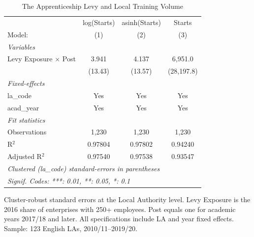 
\begin{table}[htbp]
   \caption{\label{tab:main} The Apprenticeship Levy and Local Training Volume}
   \centering
   \begin{tabular}{lccc}
      \tabularnewline \midrule \midrule
                                   & log(Starts) & asinh(Starts) & Starts \\   
      Model:                       & (1)         & (2)           & (3)\\  
      \midrule
      \emph{Variables}\\
      Levy Exposure $\times$ Post  & 3.941       & 4.137         & 6,951.0\\   
                                   & (13.43)     & (13.57)       & (28,197.8)\\   
      \midrule
      \emph{Fixed-effects}\\
      la\_code                     & Yes         & Yes           & Yes\\  
      acad\_year                   & Yes         & Yes           & Yes\\  
      \midrule
      \emph{Fit statistics}\\
      Observations                 & 1,230       & 1,230         & 1,230\\  
      R$^2$                        & 0.97804     & 0.97802       & 0.94240\\  
      Adjusted R$^2$               & 0.97540     & 0.97538       & 0.93547\\  
      \midrule \midrule
      \multicolumn{4}{l}{\emph{Clustered (la\_code) standard-errors in parentheses}}\\
      \multicolumn{4}{l}{\emph{Signif. Codes: ***: 0.01, **: 0.05, *: 0.1}}\\
   \end{tabular}
   
   \par \raggedright 
   Cluster-robust standard errors at the Local Authority level. Levy Exposure is the 2016 share of enterprises with 250+ employees. Post equals one for academic years 2017/18 and later. All specifications include LA and year fixed effects. Sample: 123 English LAs, 2010/11--2019/20.
\end{table}


